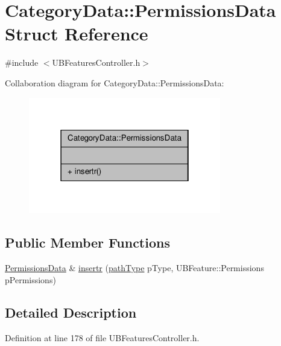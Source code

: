 \hypertarget{struct_category_data_1_1_permissions_data}{\section{Category\-Data\-:\-:Permissions\-Data Struct Reference}
\label{d1/ddd/struct_category_data_1_1_permissions_data}
}


{\ttfamily \#include $<$U\-B\-Features\-Controller.\-h$>$}



Collaboration diagram for Category\-Data\-:\-:Permissions\-Data\-:
\nopagebreak
\begin{figure}[H]
\begin{center}
\leavevmode
\includegraphics[width=238pt]{dd/dbb/struct_category_data_1_1_permissions_data__coll__graph}
\end{center}
\end{figure}
\subsection*{Public Member Functions}
\begin{DoxyCompactItemize}
\item 
\hyperlink{struct_category_data_1_1_permissions_data}{Permissions\-Data} \& \hyperlink{struct_category_data_1_1_permissions_data_a672b9e0ee8dc586d9ad0497ca45a12be}{insertr} (\hyperlink{struct_category_data_a69249ca5f66736ffb9fb8136d012030a}{path\-Type} p\-Type, U\-B\-Feature\-::\-Permissions p\-Permissions)
\end{DoxyCompactItemize}


\subsection{Detailed Description}


Definition at line 178 of file U\-B\-Features\-Controller.\-h.



